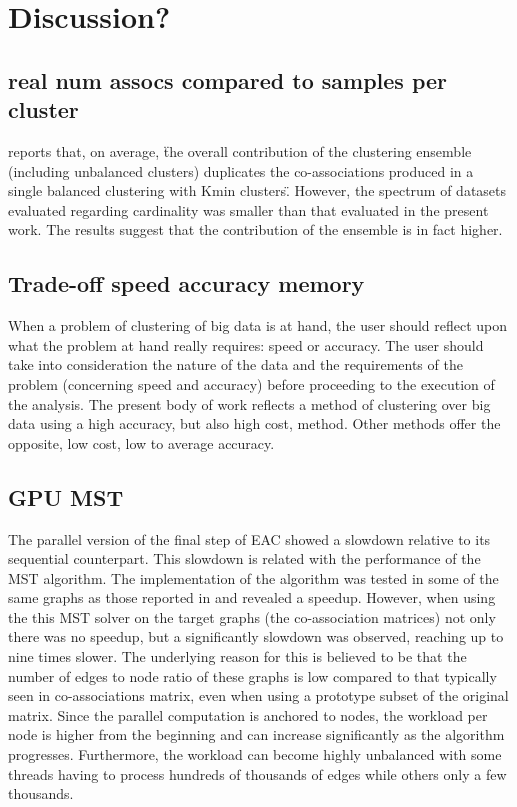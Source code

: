 
\chapter{Discussion?}
\label{chapter:discussion}

\section{real num assocs compared to samples per cluster}

\cite{Lourenco2010} reports that, on average, \"the overall contribution of the clustering ensemble (including unbalanced clusters) duplicates the co-associations produced in a single balanced clustering with Kmin clusters\".
However, the spectrum of datasets evaluated regarding cardinality was smaller than that evaluated in the present work.
The results suggest that the contribution of the ensemble is in fact higher. %

\section{Trade-off speed accuracy memory}

When a problem of clustering of big data is at hand, the user should reflect upon what the problem at hand really requires: speed or accuracy. The user should take into consideration the nature of the data and the requirements of the problem (concerning speed and accuracy) before proceeding to the execution of the analysis. The present body of work reflects a method of clustering over big data using a high accuracy, but also high cost, method. Other methods offer the opposite, low cost, low to average accuracy. 

\section{GPU MST}

The parallel version of the final step of EAC showed a slowdown relative to its sequential counterpart.
This slowdown is related with the performance of the MST algorithm.
The implementation of the algorithm was tested in some of the same graphs as those reported in \cite{Sousa2015} and revealed a speedup.
However, when using the this MST solver on the target graphs (the co-association matrices) not only there was no speedup, but a significantly slowdown was observed, reaching up to nine times slower.
The underlying reason for this is believed to be that the number of edges to node ratio of these graphs is low compared to that typically seen in co-associations matrix, even when using a prototype subset of the original matrix.
Since the parallel computation is anchored to nodes, the workload per node is higher from the beginning and can increase significantly as the algorithm progresses.
Furthermore, the workload can become highly unbalanced with some threads having to process hundreds of thousands of edges while others only a few thousands.


